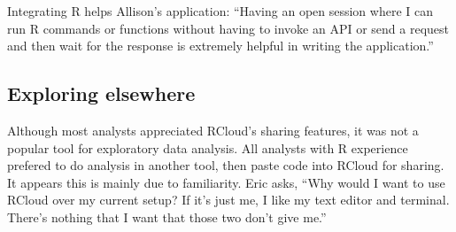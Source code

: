Integrating R helps Allison's application: ``Having an open session where I can run R commands or
functions without having to invoke an API or send a request and then
wait for the response is extremely helpful in writing the application.''




\subsection{Exploring elsewhere}

Although most analysts appreciated RCloud's sharing features,
it was not a popular tool for exploratory data analysis.
All analysts with R experience prefered to do analysis in another
tool, then paste code into RCloud for sharing.
It appears this is mainly due to familiarity.
Eric asks, ``Why would I want to use
RCloud over my current setup? If it's just me, I like my text editor and
terminal. There's nothing that I want that those two don't give me.''




